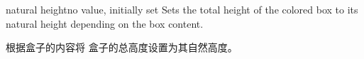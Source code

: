 \begin{docTcbKey}{natural height}{}{no value, initially set}
Sets the total height of the colored box to its natural height depending
on the box content.

根据盒子的内容将%
盒子的总高度设置为其自然高度。
\end{docTcbKey}